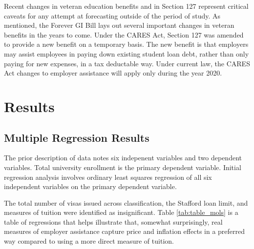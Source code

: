 \documentclass[review]{elsarticle}
\begin{document}
Recent changes in veteran education benefits and in Section 127
represent critical caveats for any attempt at forecasting outside of the period of study.
As mentioned, the Forever GI Bill lays out several important changes in veteran benefits in the years to come.
Under the CARES Act, Section 127 was amended to provide a new benefit on a temporary basis\cite{schiavo_2020}.
The new benefit is that employers may assist employees in paying down existing student loan debt,
rather than only paying for new expenses, in a tax deductable way.
Under current law, the CARES Act changes to employer assistance will apply only during the year 2020.


\section{Results}

\subsection{Multiple Regression Results}
The prior description of data notes six indepenent variables and two dependent variables.
Total university enrollment is the primary dependent variable.
Initial regression analysis involves ordinary least squares regression of all six independent variables
on the primary dependent variable.

The total number of visas issued across classification,
the Stafford loan limit, and measures of tuition were identified as insignificant.
Table \ref{tab:table_mols} is a table of regressions that helps illustrate that, somewhat surprisingly,
real measures of employer assistance capture price and inflation effects in a preferred way
compared to using a more direct measure of tuition.
\end{document}

